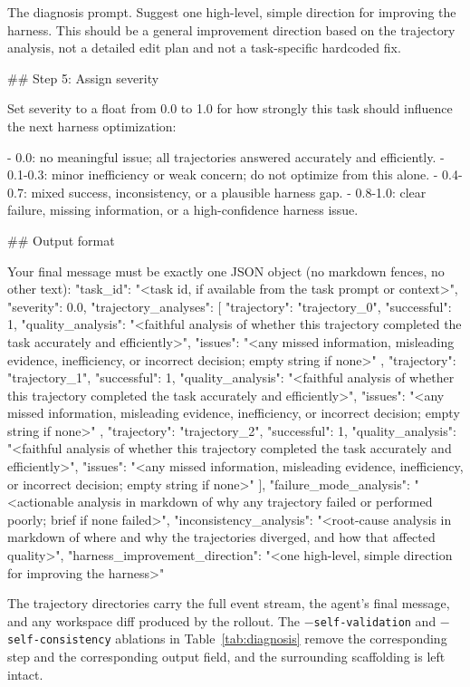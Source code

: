\documentclass{llmxive}
\begin{document}
\begin{promptbox}{The diagnosis prompt.}
Suggest one high-level, simple direction for improving the harness. This should be a general improvement direction based on the trajectory analysis, not a detailed edit plan and not a task-specific hardcoded fix.

## Step 5: Assign severity

Set severity to a float from 0.0 to 1.0 for how strongly this task should influence the next harness optimization:

- 0.0: no meaningful issue; all trajectories answered accurately and efficiently.
- 0.1-0.3: minor inefficiency or weak concern; do not optimize from this alone.
- 0.4-0.7: mixed success, inconsistency, or a plausible harness gap.
- 0.8-1.0: clear failure, missing information, or a high-confidence harness issue.

## Output format

Your final message must be exactly one JSON object (no markdown fences, no other text):
{
  "task_id": "<task id, if available from the task prompt or context>",
  "severity": 0.0,
  "trajectory_analyses": [
    {
      "trajectory": "trajectory_0",
      "successful": 1,
      "quality_analysis": "<faithful analysis of whether this trajectory completed the task accurately and efficiently>",
      "issues": "<any missed information, misleading evidence, inefficiency, or incorrect decision; empty string if none>"
    },
    {
      "trajectory": "trajectory_1",
      "successful": 1,
      "quality_analysis": "<faithful analysis of whether this trajectory completed the task accurately and efficiently>",
      "issues": "<any missed information, misleading evidence, inefficiency, or incorrect decision; empty string if none>"
    },
    {
      "trajectory": "trajectory_2",
      "successful": 1,
      "quality_analysis": "<faithful analysis of whether this trajectory completed the task accurately and efficiently>",
      "issues": "<any missed information, misleading evidence, inefficiency, or incorrect decision; empty string if none>"
    }
  ],
  "failure_mode_analysis": "<actionable analysis in markdown of why any trajectory failed or performed poorly; brief if none failed>",
  "inconsistency_analysis": "<root-cause analysis in markdown of where and why the trajectories diverged, and how that affected quality>",
  "harness_improvement_direction": "<one high-level, simple direction for improving the harness>"
}
\end{promptbox}

\noindent{} The trajectory directories carry the full event stream, the
agent's final message, and any workspace diff produced by the rollout.
The \texttt{$-$self-validation} and \texttt{$-$self-consistency}
ablations in Table~\ref{tab:diagnosis} remove the corresponding step
and the corresponding output field, and the surrounding scaffolding is
left intact.
\end{document}
